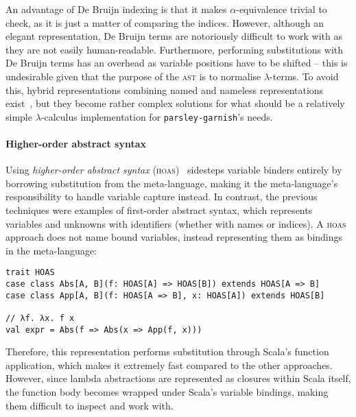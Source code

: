\documentclass[../../../main.tex]{subfiles}
\begin{document}
An advantage of De Bruijn indexing is that it makes $\alpha$-equivalence trivial to check, as it is just a matter of comparing the indices.
However, although an elegant representation, De Bruijn terms are notoriously difficult to work with as they are not easily human-readable.
Furthermore, performing substitutions with De Bruijn terms has an overhead as variable positions have to be shifted -- this is undesirable given that the purpose of the \textsc{ast} is to normalise $\lambda$-terms.
To avoid this, hybrid representations combining named and nameless representations exist~\cite{mcbride_imnotanumber_2004,chargueraud_locally_2012}, but they become rather complex solutions for what should be a relatively simple $\lambda$-calculus implementation for \texttt{parsley-garnish}'s needs.

\paragraph{Higher-order abstract syntax}
Using \emph{higher-order abstract syntax} (\textsc{hoas})~\cite{pfenning_hoas_1988} sidesteps variable binders entirely by borrowing substitution from the meta-language, making it the meta-language's responsibility to handle variable capture instead.
In contrast, the previous techniques were examples of first-order abstract syntax, which represents variables and unknowns with identifiers (whether with names or indices).
A \textsc{hoas} approach does not name bound variables, instead representing them as bindings in the meta-language:

\begin{verbatim}
trait HOAS
case class Abs[A, B](f: HOAS[A] => HOAS[B]) extends HOAS[A => B]
case class App[A, B](f: HOAS[A => B], x: HOAS[A]) extends HOAS[B]

// λf. λx. f x
val expr = Abs(f => Abs(x => App(f, x)))
\end{verbatim}
%
Therefore, this representation performs substitution through Scala's function application, which makes it extremely fast compared to the other approaches.
However, since lambda abstractions are represented as closures within Scala itself, the function body becomes wrapped under Scala's variable bindings, making them difficult to inspect and work with.

\end{document}
